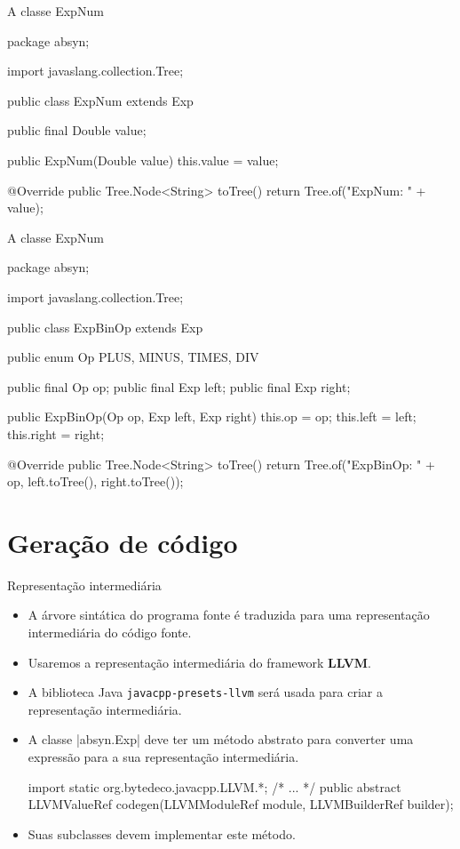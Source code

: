\documentclass[smaller]{beamer}
\begin{document}
\begin{frame}{A classe ExpNum}
\begin{pygmented}[]
package absyn;

import javaslang.collection.Tree;

public class ExpNum extends Exp {

   public final Double value;

   public ExpNum(Double value) {
      this.value = value;
   }

   @Override
   public Tree.Node<String> toTree() {
      return Tree.of("ExpNum: " + value);
   }
}
\end{pygmented}
\end{frame}

\begin{frame}{A classe ExpNum}
\begin{pygmented}[]
package absyn;

import javaslang.collection.Tree;

public class ExpBinOp extends Exp {

   public enum Op {PLUS, MINUS, TIMES, DIV}

   public final Op op;
   public final Exp left;
   public final Exp right;

   public ExpBinOp(Op op, Exp left, Exp right) {
      this.op = op;
      this.left = left;
      this.right = right;
   }

   @Override
   public Tree.Node<String> toTree() {
      return Tree.of("ExpBinOp: " + op, left.toTree(), right.toTree());
   }
}
\end{pygmented}
\end{frame}


\section{Geração de código}

\begin{frame}{Representação intermediária}
  \begin{itemize}
    \item A árvore sintática do programa fonte é traduzida para uma
    representação intermediária do código fonte.
    \item Usaremos a representação intermediária do framework
    \textbf{LLVM}.
    \item A biblioteca Java \texttt{javacpp-presets-llvm} será usada
    para criar a representação intermediária.
    \item A classe \pyginline|absyn.Exp| deve ter um método abstrato
    para converter uma expressão para a sua representação
    intermediária.
\begin{pygmented}[]
import static org.bytedeco.javacpp.LLVM.*;
/* ... */
public abstract LLVMValueRef codegen(LLVMModuleRef module,
                                     LLVMBuilderRef builder);
\end{pygmented}
    \item Suas subclasses devem implementar este método.
  \end{itemize}
\end{frame}
\end{document}
